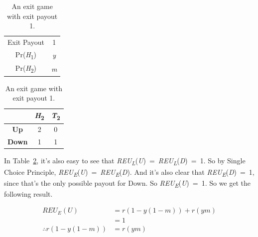 \documentclass[
  12pt,
  letterpaper,
  DIV=11,
  numbers=noendperiod]{scrreprt}
\begin{document}
\begin{table}

\caption{\label{tbl-one-coin-exit}An exit game with exit payout
1.}\begin{minipage}[t]{0.50\linewidth}

{\centering 

\begin{tabular}[t]{cc}
\toprule
Exit Payout & 1\\
Pr(\emph{H}\textsubscript{1}) & \emph{y}\\
Pr(\emph{H}\textsubscript{2}) & \emph{m}\\
\bottomrule
\end{tabular}

}

\end{minipage}%
%
\begin{minipage}[t]{0.50\linewidth}

{\centering 

\begin{tabular}[t]{ccc}
\toprule
 & \textbf{\emph{H}}\textsubscript{\textbf{2}} & \textbf{\emph{T}}\textsubscript{\textbf{2}}\\
\midrule
\textbf{Up} & 2 & 0\\
\textbf{Down} & 1 & 1\\
\bottomrule
\end{tabular}

}

\end{minipage}%

\end{table}

In Table~\ref{tbl-one-coin-exit}, it's also easy to see that
\emph{REU\textsubscript{L}}(\emph{U})~=~\emph{REU\textsubscript{L}}(\emph{D})~=~1.
So by Single Choice Principle,
\emph{REU\textsubscript{E}}(\emph{U})~=~\emph{REU\textsubscript{E}}(\emph{D}).
And it's also clear that \emph{REU\textsubscript{E}}(\emph{D})~=~1,
since that's the only possible payout for Down. So
\emph{REU\textsubscript{E}}(\emph{U})~=~1. So we get the following
result.

\begin{align*}
REU_E(U) &= r(1-y(1-m)) + r(ym) \\
 &= 1    \\
\therefore  r(1-y(1-m)) &= r(ym)
\end{align*}
\end{document}
